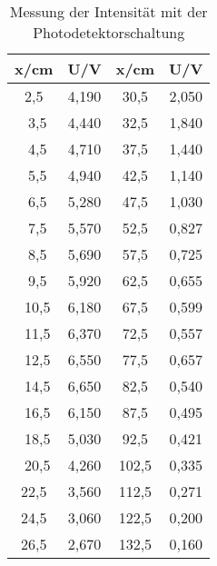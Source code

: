 \begin{table}[h!]
  \centering
  \caption{Messung der Intensität mit der Photodetektorschaltung}
  \label{tab:Intensität}
  \begin{tabular}{c c c c}
    \toprule
     x/cm &	 U/V & x/cm & U/V	   \\
    \midrule
2,5 	& 4,190  &  30,5	& 2,050\\\
3,5 	& 4,440  &  32,5	& 1,840\\\
4,5 	& 4,710  &  37,5	& 1,440\\\
5,5 	& 4,940  &  42,5	& 1,140\\\
6,5 	& 5,280  &  47,5	& 1,030\\\
7,5 	& 5,570  &  52,5	& 0,827\\\
8,5 	& 5,690  &  57,5	& 0,725\\\
9,5 	& 5,920  &  62,5	& 0,655\\\
10,5	& 6,180  &  67,5	& 0,599\\\
11,5	& 6,370  &  72,5	& 0,557\\\
12,5	& 6,550  &  77,5	& 0,657\\\
14,5	& 6,650  &  82,5	& 0,540\\\
16,5	& 6,150  &  87,5	& 0,495\\\
18,5	& 5,030  &  92,5	& 0,421\\\
20,5	& 4,260  &  102,5	& 0,335\\
22,5	& 3,560  &  112,5	& 0,271\\
24,5	& 3,060  &  122,5	& 0,200\\
26,5	& 2,670  &  132,5	& 0,160\\


    \bottomrule
  \end{tabular}
\end{table}

